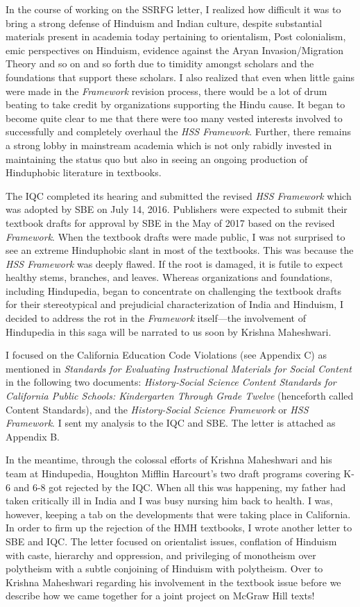 In the course of working on the SSRFG letter, I realized how difficult it was to bring a strong defense of Hinduism and Indian culture, despite substantial materials present in academia today pertaining to orientalism, Post colonialism, emic perspectives on Hinduism, evidence against the Aryan Invasion/Migration Theory and so on and so forth due to timidity amongst scholars and the foundations that support these scholars. I also realized that even when little gains were made in the \textit{Framework} revision process, there would be a lot of drum beating to take credit by organizations supporting the Hindu cause. It began to become quite clear to me that there were too many vested interests involved to successfully and completely overhaul the \textit{HSS Framework}. Further, there remains a strong lobby in mainstream academia which is not only rabidly invested in maintaining the status quo but also in seeing an ongoing production of Hinduphobic literature in textbooks. 

The IQC completed its hearing and submitted the revised \textit{HSS Framework} which was adopted by SBE on July 14, 2016. Publishers were expected to submit their textbook drafts for approval by SBE in the May of 2017 based on the revised \textit{Framework}. When the textbook drafts were made public, I was not surprised to see an extreme Hinduphobic slant in most of the textbooks. This was because the \textit{HSS Framework} was deeply flawed. If the root is damaged, it is futile to expect healthy stems, branches, and leaves. Whereas organizations and foundations, including Hindupedia, began to concentrate on challenging the textbook drafts for their stereotypical and prejudicial characterization of India and Hinduism, I decided to address the rot in the \textit{Framework} itself—the involvement of Hindupedia in this saga will be narrated to us soon by Krishna Maheshwari. 

I focused on the California Education Code Violations (see Appendix C) as mentioned in \textit{Standards for Evaluating Instructional Materials for Social Content} in the following two documents: \textit{History-Social Science Content Standards for California Public Schools: Kindergarten Through Grade Twelve} (henceforth called Content Standards), and the \textit{History-Social Science Framework} or \textit{HSS Framework}. I sent my analysis to the IQC and SBE. The letter is attached as Appendix B. 

In the meantime, through the colossal efforts of Krishna Maheshwari and his team at Hindupedia, Houghton Mifflin Harcourt’s two draft programs covering K-6 and 6-8 got rejected by the IQC. When all this was happening, my father had taken critically ill in India and I was busy nursing him back to health. I was, however, keeping a tab on the developments that were taking place in California. In order to firm up the rejection of the HMH textbooks, I wrote another letter to SBE and IQC. The letter focused on orientalist issues, conflation of Hinduism with caste, hierarchy and oppression, and privileging of monotheism over polytheism with a subtle conjoining of Hinduism with polytheism. Over to Krishna Maheshwari regarding his involvement in the textbook issue before we describe how we came together for a joint project on McGraw Hill texts! 

